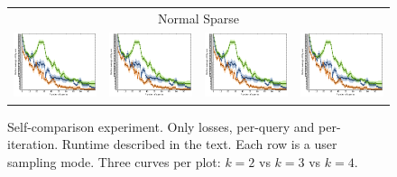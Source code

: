\documentclass{article}
\renewcommand\[{\begin{equation}}
\renewcommand\]{\end{equation}}
\begin{document}
\begin{figure}[b]
{\begin{tabular}{cccc}
        \\
        \hline
        \multicolumn{4}{c}{{\sc Normal Sparse}}
        \\
        \includegraphics[width=10em]{figures/loss} &
        \includegraphics[width=10em]{figures/loss} &
        \includegraphics[width=10em]{figures/loss} &
        \includegraphics[width=10em]{figures/loss}
        \\
        \hline
    \end{tabular}
    \caption{\label{fig:selfcomparison} Self-comparison experiment. Only
    losses, per-query and per-iteration. Runtime described in the text. Each
    row is a user sampling mode. Three curves per plot: $k=2$ vs $k=3$ vs
    $k=4$.}
    }
\end{figure}
\end{document}
